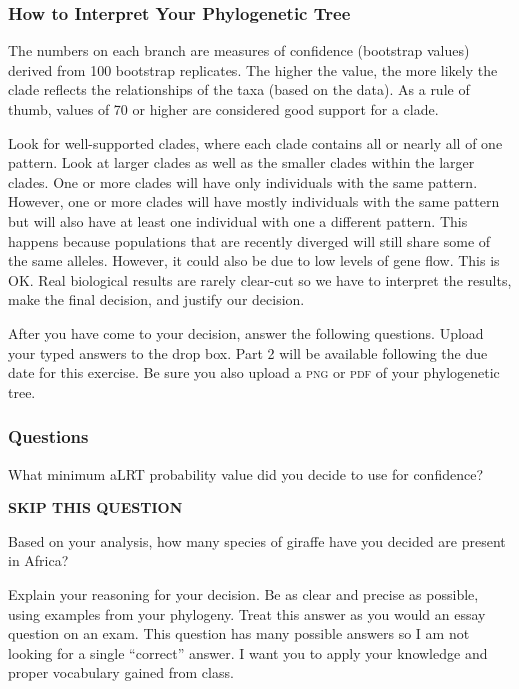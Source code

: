 \documentclass[11pt, addpoints]{exam}
\begin{document}
\subsubsection*{How to Interpret Your Phylogenetic Tree}

The numbers on each branch are measures of confidence (bootstrap values) derived from
100 bootstrap replicates. The higher the
value, the more likely the clade reflects the relationships of the taxa (based
on the data). As a rule of thumb, values of 70 or higher are considered
good support for a clade. 

Look for well-supported clades, where each clade contains all or nearly
all of one pattern. Look at larger clades as well as the smaller clades
within the larger clades. One or more clades will have only individuals
with the same pattern. However, one or more clades will have mostly
individuals with the same pattern but will also have at least one
individual with one a different pattern. This happens because
populations that are recently diverged will still share some of the same
alleles. However, it could also be due to low levels of gene flow. This
is OK. Real biological results are rarely clear-cut so we have to
interpret the results, make the final decision, and justify our
decision.

After you have come to your decision, answer the following questions. 
Upload your typed answers to the drop box. Part 2 will be available following 
the due date for this exercise. Be sure you also upload a \textsc{png} or \textsc{pdf} of your phylogenetic tree.


\subsubsection*{Questions}
\label{sec:questions}

\begin{questions}

\question[1]
What minimum aLRT probability value did you decide to use for
confidence? 

\textbf{SKIP THIS QUESTION}

\question[1]
Based on your analysis, how many species of giraffe have you decided
are present in Africa? 

\question[10]
Explain your reasoning for your decision. Be as clear and
precise as possible, using examples from your phylogeny. Treat this
answer as you would an essay question on an exam. This question has 
many possible answers so I am not looking for a
single “correct” answer. I want you to
apply your knowledge and proper vocabulary gained from class.

\end{questions}
\end{document}
